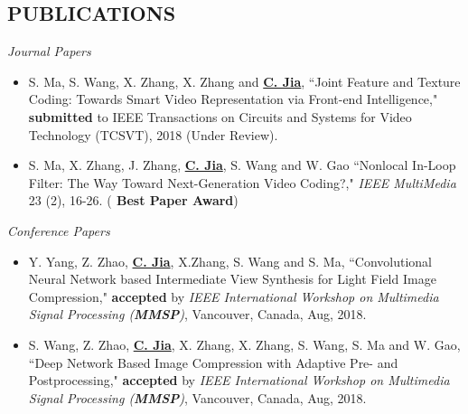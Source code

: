 \documentclass[margin, 10pt]{res} %
\begin{document}
\begin{resume}

\section{PUBLICATIONS}
{\sl Journal Papers}
\begin{itemize}
\item{S. Ma, S. Wang, X. Zhang, X. Zhang and \underline{\bf C. Jia}, ``Joint Feature and Texture Coding: Towards Smart Video Representation via Front-end Intelligence," {\bf submitted} to IEEE Transactions on Circuits and Systems for Video Technology (TCSVT), 2018 (Under Review).}
\item{S. Ma, X. Zhang, J. Zhang, \underline{\bf C. Jia}, S. Wang and W. Gao ``Nonlocal In-Loop Filter: The Way Toward Next-Generation Video Coding?," {\em {IEEE} MultiMedia} 23 (2), 16-26.} ({\bf{\color{red} Best Paper Award}})
\end{itemize}

{\sl Conference Papers}
\begin{itemize}
\item{Y. Yang, Z. Zhao, \underline{\bf C. Jia}, X.Zhang, S. Wang and S. Ma, ``Convolutional Neural Network based Intermediate View Synthesis for Light Field Image Compression," {\bf accepted} by {\em IEEE International Workshop on Multimedia Signal Processing ({\bf MMSP})}, Vancouver, Canada, Aug, 2018. }

\item{S. Wang, Z. Zhao, \underline{\bf C. Jia}, X. Zhang, X. Zhang, S. Wang, S. Ma and W. Gao, ``Deep Network Based Image Compression with Adaptive Pre- and Postprocessing," {\bf accepted} by {\em IEEE International Workshop on Multimedia Signal Processing ({\bf MMSP})}, Vancouver, Canada, Aug, 2018. }


\end{itemize}
\end{resume}
\end{document}
